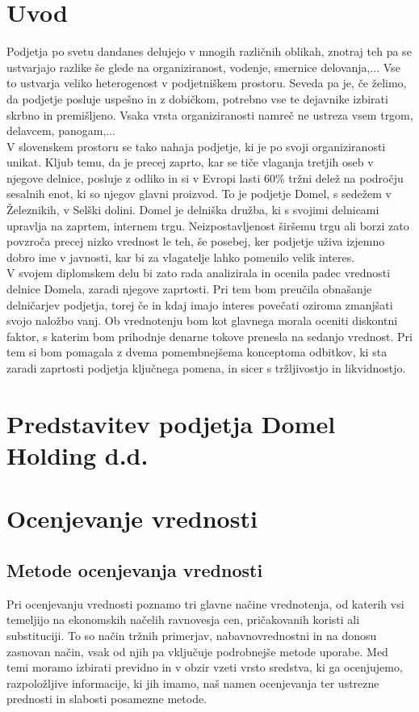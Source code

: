 \documentclass[12pt,a4paper]{amsart}
\theoremstyle{definition} %
\theoremstyle{plain} %
\begin{document}
\section{Uvod}
Podjetja po svetu dandanes delujejo v mnogih različnih oblikah, znotraj teh pa se ustvarjajo razlike še glede na organiziranost, vodenje, smernice delovanja,... Vse to ustvarja veliko heterogenost v podjetniškem prostoru. Seveda pa je, če želimo, da podjetje posluje uspešno in z dobičkom, potrebno vse te dejavnike izbirati skrbno in premišljeno. Vsaka vrsta organiziranosti namreč ne ustreza vsem trgom, delavcem, panogam,... \\
V slovenskem prostoru se tako nahaja podjetje, ki je po svoji organiziranosti unikat. Kljub temu, da je precej zaprto, kar se tiče vlaganja tretjih oseb v njegove delnice, posluje z odliko in si v Evropi lasti 60\% tržni delež na področju sesalnih enot, ki so njegov glavni proizvod. To je podjetje Domel, s sedežem v Železnikih, v Selški dolini. Domel je delniška družba, ki s svojimi delnicami upravlja na zaprtem, internem trgu. Neizpostavljenost širšemu trgu ali borzi zato povzroča precej nizko vrednost le teh, še posebej, ker podjetje uživa izjemno dobro ime v javnosti, kar bi za vlagatelje lahko pomenilo velik interes.\\
V svojem diplomskem delu bi zato rada analizirala in ocenila padec vrednosti delnice Domela, zaradi njegove zaprtosti. Pri tem bom preučila obnašanje delničarjev podjetja, torej če in kdaj imajo interes povečati oziroma zmanjšati svojo naložbo vanj. Ob vrednotenju bom kot glavnega morala oceniti diskontni faktor, s katerim bom prihodnje denarne tokove prenesla na sedanjo vrednost. Pri tem si bom pomagala z dvema pomembnejšema konceptoma odbitkov, ki sta zaradi zaprtosti podjetja ključnega pomena, in sicer s tržljivostjo in likvidnostjo.
\newpage

\section{Predstavitev podjetja Domel Holding d.d.}

\section{Ocenjevanje vrednosti}
\subsection{Metode ocenjevanja vrednosti}
Pri ocenjevanju vrednosti poznamo tri glavne načine vrednotenja, od katerih vsi temeljijo na ekonomskih načelih ravnovesja cen, pričakovanih koristi ali substituciji. To so način tržnih primerjav, nabavnovrednostni in na donosu zasnovan način, vsak od njih pa vključuje podrobnejše metode uporabe. Med temi moramo izbirati previdno in v obzir vzeti vrsto sredstva, ki ga ocenjujemo, razpoložljive informacije, ki jih imamo, naš namen ocenjevanja ter ustrezne prednosti in slabosti posamezne metode. 
\end{document}
